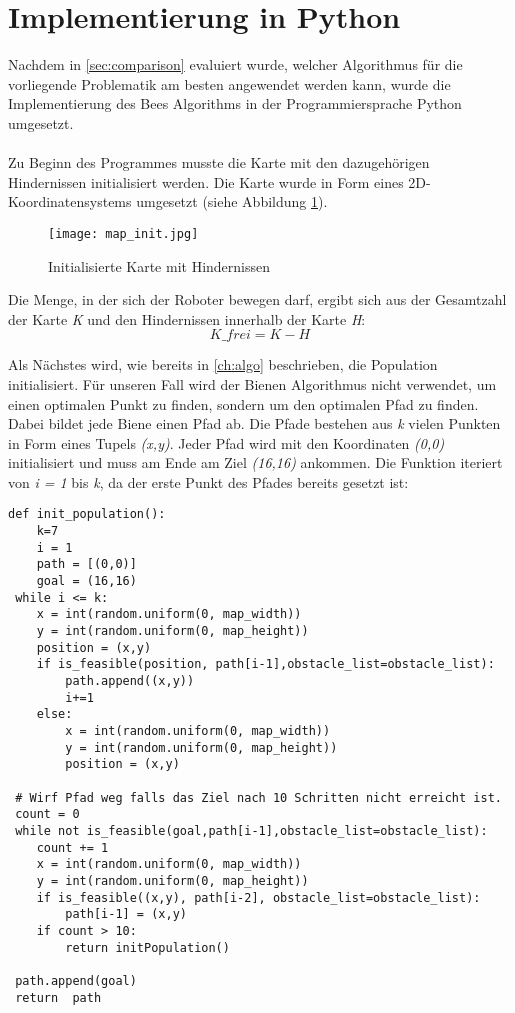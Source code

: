 \label{ch:anwendungAlgo}
\section{Implementierung in Python}
Nachdem in \autoref{sec:comparison} evaluiert wurde, welcher Algorithmus für die vorliegende Problematik am besten angewendet werden kann, wurde die Implementierung des \glqq Bees Algorithms\grqq{} in der Programmiersprache Python umgesetzt.\\\\
Zu Beginn des Programmes musste die Karte mit den dazugehörigen Hindernissen initialisiert werden. Die Karte wurde in Form eines 2D-Koordinatensystems umgesetzt (siehe Abbildung \ref{fig:map_init}).

\begin{figure}[h]
    \centering
    \texttt{[image: map\_init.jpg]}
    \caption{Initialisierte Karte mit Hindernissen\\}   
    \label{fig:map_init}
\end{figure}

Die Menge, in der sich der Roboter bewegen darf, ergibt sich aus der Gesamtzahl der Karte \emph{K} und den Hindernissen innerhalb der Karte \emph{H}:
\[K\_frei = K - H\]

Als Nächstes wird, wie bereits in \autoref{ch:algo} beschrieben, die Population initialisiert. Für unseren Fall wird der Bienen Algorithmus nicht verwendet, um einen optimalen Punkt zu finden, sondern um den optimalen Pfad zu finden. Dabei bildet jede Biene einen Pfad ab. Die Pfade bestehen aus \emph{k} vielen Punkten in Form eines Tupels \emph{(x,y)}. Jeder Pfad wird mit den Koordinaten \emph{(0,0)} initialisiert und muss am Ende am Ziel \emph{(16,16)} ankommen. Die Funktion iteriert von \emph{i = 1} bis \emph{k}, da der erste Punkt des Pfades bereits gesetzt ist:

\begin{verbatim}
def init_population():
    k=7
    i = 1
    path = [(0,0)]
    goal = (16,16)
 while i <= k:
    x = int(random.uniform(0, map_width))
    y = int(random.uniform(0, map_height))
    position = (x,y)
    if is_feasible(position, path[i-1],obstacle_list=obstacle_list):
        path.append((x,y))
        i+=1
    else: 
        x = int(random.uniform(0, map_width))
        y = int(random.uniform(0, map_height))
        position = (x,y)
            
 # Wirf Pfad weg falls das Ziel nach 10 Schritten nicht erreicht ist.
 count = 0
 while not is_feasible(goal,path[i-1],obstacle_list=obstacle_list):
    count += 1
    x = int(random.uniform(0, map_width))
    y = int(random.uniform(0, map_height))
    if is_feasible((x,y), path[i-2], obstacle_list=obstacle_list):
        path[i-1] = (x,y)
    if count > 10:
        return initPopulation()   
    
 path.append(goal)
 return  path
\end{verbatim}
\vspace*{-3mm}
\vspace*{3mm}

